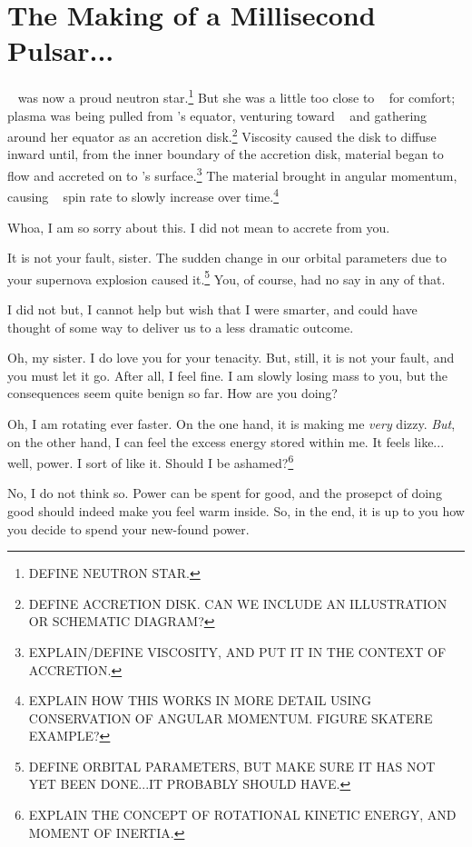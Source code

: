 \documentclass[main.tex]{subfiles}
\begin{document}
\chapter{The Making of a Millisecond Pulsar...}

\newpara \nar \rmmerope~ was now a proud neutron star.\footnote{DEFINE NEUTRON STAR.}  But she was a little too close to \rmmaia~ for comfort; plasma was being pulled from \rmmaia's equator, venturing toward \rmmerope~ and gathering around her equator as an accretion disk.\footnote{DEFINE ACCRETION DISK.  CAN WE INCLUDE AN ILLUSTRATION OR SCHEMATIC DIAGRAM?}  Viscosity caused the disk to diffuse inward until, from the inner boundary of the accretion disk, material began to flow and accreted on to \rmmerope's surface.\footnote{EXPLAIN/DEFINE VISCOSITY, AND PUT IT IN THE CONTEXT OF ACCRETION.}  The material brought in angular momentum, causing \rmmerope~ spin rate to slowly increase over time.\footnote{EXPLAIN HOW THIS WORKS IN MORE DETAIL USING CONSERVATION OF ANGULAR MOMENTUM. FIGURE SKATERE EXAMPLE?}

\newpara \Merope Whoa, I am so sorry about this.  I did not mean to accrete from you.

\newpara \Maia It is not your fault, sister.  The sudden change in our orbital parameters due to your supernova explosion caused it.\footnote{DEFINE ORBITAL PARAMETERS, BUT MAKE SURE IT HAS NOT YET BEEN DONE...IT PROBABLY SHOULD HAVE.}  You, of course, had no say in any of that.

\newpara \Merope I did not but, I cannot help but wish that I were smarter, and could have thought of some way to deliver us to a less dramatic outcome.

\newpara \Maia Oh, my sister.  I do love you for your tenacity.  But, still, it is not your fault, and you must let it go.  After all, I feel fine.  I am slowly losing mass to you, but the consequences seem quite benign so far.  How are you doing?

\newpara \Merope Oh, I am rotating ever faster.  On the one hand, it is making me \textit{very} dizzy.  \textit{But}, on the other hand, I can feel the excess energy stored within me.  It feels like... well, power.  I sort of like it.  Should I be ashamed?\footnote{EXPLAIN THE CONCEPT OF ROTATIONAL KINETIC ENERGY, AND MOMENT OF INERTIA.}

\newpara \Maia No, I do not think so.  Power can be spent for good, and the prosepct of doing good should indeed make you feel warm inside.  So, in the end, it is up to you how you decide to spend your new-found power.
\end{document}
